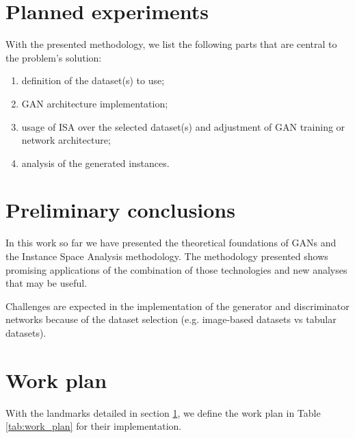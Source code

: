 \section{Planned experiments} \label{sec:experiments}

With the presented methodology, we list the following parts that are central to the problem's solution:

\begin{enumerate}[label=\Alph*.]
	\item definition of the dataset(s) to use;
	\item GAN architecture implementation;
	\item usage of ISA over the selected dataset(s) and adjustment of GAN training or network architecture;
	\item analysis of the generated instances.
\end{enumerate}

\section{Preliminary conclusions}

In this work so far we have presented the theoretical foundations of GANs and the Instance Space Analysis methodology. The methodology presented shows promising applications of the combination of those technologies and new analyses that may be useful.

Challenges are expected in the implementation of the generator and discriminator networks because of the dataset selection (e.g. image-based datasets vs tabular datasets). 

\section{Work plan}

With the landmarks detailed in section \ref{sec:experiments}, we define the work plan in Table \ref{tab:work_plan} for their implementation.

